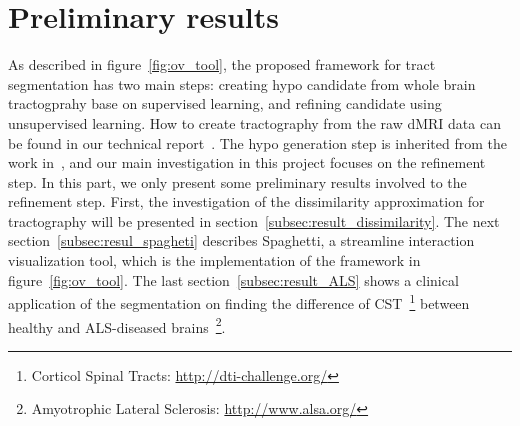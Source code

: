 \section{Preliminary results}
\label{sec:preliminary_results}
As described in figure~\ref{fig:ov_tool}, the proposed framework for tract segmentation has two main steps: creating hypo candidate from whole brain tractogprahy base on supervised learning, and refining candidate using unsupervised learning. How to create tractography from the raw dMRI data can be found in our technical report~\cite{bao2012dmri}. The hypo generation step is inherited from the work in~\cite{olivetti2011supervised}, and our main investigation in this project focuses on the refinement step. In this part, we only present some preliminary results involved to the refinement step. First, the investigation of the dissimilarity approximation for tractography will be presented in section~\ref{subsec:result_dissimilarity}. The next section~\ref{subsec:resul_spagheti} describes Spaghetti, a streamline interaction visualization tool, which is the implementation of the framework in figure~\ref{fig:ov_tool}. The last section~\ref{subsec:result_ALS} shows a clinical application of the segmentation on finding the difference of CST~\footnote{Corticol Spinal Tracts: \url{http://dti-challenge.org/}} between healthy and ALS-diseased brains~\footnote{Amyotrophic Lateral Sclerosis: \url{http://www.alsa.org/}}.
